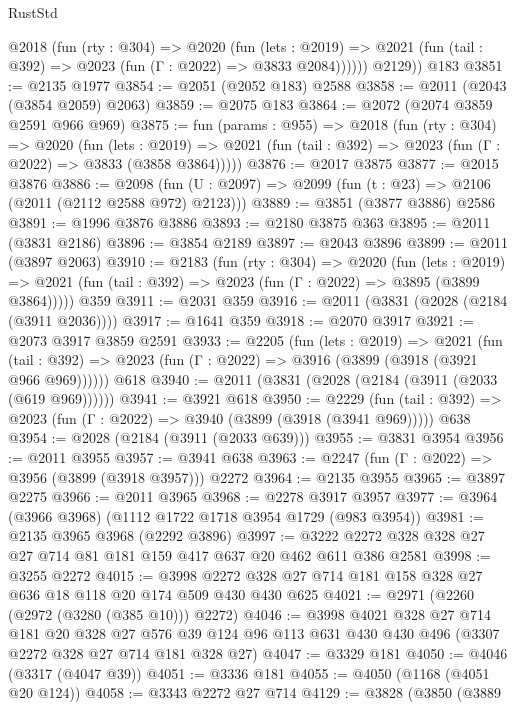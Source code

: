 \begin{lexlean}{RustStd}
\begin{coremodule}
          @2018
            (fun (rty : @304) =>
            @2020
              (fun (lets : @2019) =>
              @2021 (fun (tail : @392) => @2023 (fun (Γ : @2022) => @3833 @2084))))))
        @2129))
    @183
@3851 := @2135 @1977
@3854 := @2051 (@2052 @183) @2588
@3858 := @2011 (@2043 (@3854 @2059) @2063)
@3859 := @2075 @183
@3864 := @2072 (@2074 @3859 @2591 @966 @969)
@3875 := fun (params : @955) =>
  @2018
    (fun (rty : @304) =>
    @2020
      (fun (lets : @2019) =>
      @2021 (fun (tail : @392) => @2023 (fun (Γ : @2022) => @3833 (@3858 @3864)))))
@3876 := @2017 @3875
@3877 := @2015 @3876
@3886 := @2098 (fun (U : @2097) => @2099 (fun (t : @23) => @2106 (@2011 (@2112 @2588 @972) @2123)))
@3889 := @3851 (@3877 @3886) @2586
@3891 := @1996 @3876 @3886
@3893 := @2180 @3875 @363
@3895 := @2011 (@3831 @2186)
@3896 := @3854 @2189
@3897 := @2043 @3896
@3899 := @2011 (@3897 @2063)
@3910 := @2183
    (fun (rty : @304) =>
    @2020
      (fun (lets : @2019) =>
      @2021 (fun (tail : @392) => @2023 (fun (Γ : @2022) => @3895 (@3899 @3864)))))
    @359
@3911 := @2031 @359
@3916 := @2011 (@3831 (@2028 (@2184 (@3911 @2036))))
@3917 := @1641 @359
@3918 := @2070 @3917
@3921 := @2073 @3917 @3859 @2591
@3933 := @2205
    (fun (lets : @2019) =>
    @2021 (fun (tail : @392) => @2023 (fun (Γ : @2022) => @3916 (@3899 (@3918 (@3921 @966 @969))))))
    @618
@3940 := @2011 (@3831 (@2028 (@2184 (@3911 (@2033 (@619 @969))))))
@3941 := @3921 @618
@3950 := @2229
    (fun (tail : @392) => @2023 (fun (Γ : @2022) => @3940 (@3899 (@3918 (@3941 @969)))))
    @638
@3954 := @2028 (@2184 (@3911 (@2033 @639)))
@3955 := @3831 @3954
@3956 := @2011 @3955
@3957 := @3941 @638
@3963 := @2247 (fun (Γ : @2022) => @3956 (@3899 (@3918 @3957))) @2272
@3964 := @2135 @3955
@3965 := @3897 @2275
@3966 := @2011 @3965
@3968 := @2278 @3917 @3957
@3977 := @3964 (@3966 @3968) (@1112 @1722 @1718 @3954 @1729 (@983 @3954))
@3981 := @2135 @3965 @3968 (@2292 @3896)
@3997 := @3222 @2272 @328 @328 @27 @27 @714 @81 @181 @159 @417 @637 @20 @462 @611 @386 @2581
@3998 := @3255 @2272
@4015 := @3998 @2272 @328 @27 @714 @181 @158 @328 @27 @636 @18 @118 @20 @174 @509 @430 @430 @625
@4021 := @2971 (@2260 (@2972 (@3280 (@385 @10))) @2272)
@4046 := @3998
    @4021
    @328
    @27
    @714
    @181
    @20
    @328
    @27
    @576
    @39
    @124
    @96
    @113
    @631
    @430
    @430
    @496
    (@3307 @2272 @328 @27 @714 @181 @328 @27)
@4047 := @3329 @181
@4050 := @4046 (@3317 (@4047 @39))
@4051 := @3336 @181
@4055 := @4050 (@1168 (@4051 @20 @124))
@4058 := @3343 @2272 @27 @714
@4129 := @3828
    (@3850
      (@3889

\end{coremodule}
\end{lexlean}
